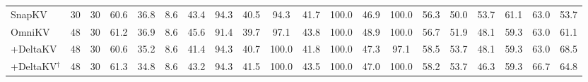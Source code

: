 \begin{table}[t]
{\begin{tabular}{l cc c cccccccccc c ccccc}
SnapKV & 30 & 30 & 60.6 & 36.8 & 8.6 & 43.4 & 94.3 & 40.5 & 94.3 & 41.7 & 100.0 & 46.9 & 100.0 & 56.3 & 50.0 & 53.7 & 61.1 & 63.0 & 53.7 \\
OmniKV & 48 & 30 & 61.2 & 36.9 & 8.6 & 45.6 & 91.4 & 39.7 & 97.1 & 43.8 & 100.0 & 48.9 & 100.0 & 56.7 & 51.9 & 48.1 & 59.3 & 63.0 & 61.1 \\
\quad +DeltaKV & 48 & 30 & 60.6 & 35.2 & 8.6 & 41.4 & 94.3 & 40.7 & 100.0 & 41.8 & 100.0 & 47.3 & 97.1 & 58.5 & 53.7 & 48.1 & 59.3 & 63.0 & 68.5 \\
\quad +DeltaKV$^\dagger$ & 48 & 30 & 61.3 & 34.8 & 8.6 & 43.2 & 94.3 & 41.5 & 100.0 & 43.5 & 100.0 & 47.0 & 100.0 & 58.2 & 53.7 & 46.3 & 59.3 & 66.7 & 64.8  \\
\bottomrule
\end{tabular}
}
\end{table}
